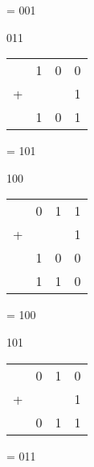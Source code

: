 \begin{enumerate}[label=(\alph*)]
\begin{figure}[H]
\begin{minipage}[t]{0.45\textwidth}
        = 001
    \end{minipage}\hfill
    \begin{minipage}[t]{0.45\textwidth}
        \item 011
        \begin{table}[H]
            \centering
            \begin{tabularx}{0.4\textwidth}{XXXX}
                & 1 & 0 & 0\\    
                + & & & 1 \\
                \hline
                & 1 & 0 & 1\\
                \hline            
            \end{tabularx}
        \end{table}
        = 101
    \end{minipage}\hfill
\end{figure}
\begin{figure}[H]
    \begin{minipage}[t]{0.45\textwidth}
        \item 100
        \begin{table}[H]
            \centering
            \begin{tabularx}{0.4\textwidth}{XXXX}
                & 0 & 1 & 1\\    
                + & & & 1 \\
                \hline
                & 1 & 0 & 0\\
                \hline 
                & 1 & 1 & 0\\           
            \end{tabularx}
        \end{table}
        = 100
    \end{minipage}\hfill
    \begin{minipage}[t]{0.45\textwidth}
        \item 101
        \begin{table}[H]
            \centering
            \begin{tabularx}{0.4\textwidth}{XXXX}
                & 0 & 1 & 0\\    
                + & & & 1 \\
                \hline
                & 0 & 1 & 1\\
                \hline            
            \end{tabularx}
        \end{table}
        = 011
    \end{minipage}\hfill

\end{figure}
\end{enumerate}
